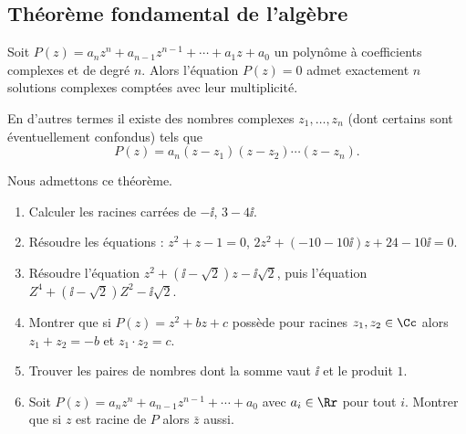 \documentclass[class=report,crop=false]{standalone}
\begin{document}
\subsection{Théorème fondamental de l'algèbre}

\begin{theoreme}
Soit $P (z) = a_n z^n + a_{n - 1} z^{n - 1}
  + \cdots + a_1 z + a_0$ un polyn\^ome \`a coefficients complexes
  et de degré $n$. Alors l'équation $P(z) = 0$ admet exactement $n$
  solutions complexes comptées avec leur multiplicité.

  En d'autres termes il existe des nombres complexes $z_1, \ldots, z_n$ (dont certains sont
  éventuellement confondus) tels que
  \[ P (z) = a_n  \left( z - z_1 \right) \left( z - z_2 \right)
     \cdots \left( z - z_n \right) . \]
\end{theoreme}

Nous admettons ce théorème.



\begin{miniexercices}
\sauteligne
\begin{enumerate}
  \item Calculer les racines carrées de $-\ii$, $3-4\ii$.
  \item Résoudre les équations : $z^2+z-1=0$, $2z^2 + (-10-10\ii)z+24-10\ii = 0$.
  \item Résoudre l'équation $z^2+(\ii-\sqrt 2)z-\ii\sqrt 2$, puis l'équation $Z^4+(\ii-\sqrt 2)Z^2-\ii\sqrt 2$.
  \item Montrer que si $P(z)=z^2+bz+c$ possède pour racines $z_1, z_2 \in \Cc$ alors
$z_1+z_2=-b$ et $z_1 \cdot z_2 = c$.
  \item Trouver les paires de nombres dont la somme vaut $\ii$ et le produit $1$.
  \item Soit $P (z) = a_n z^n + a_{n - 1} z^{n - 1} + \cdots  + a_0$ avec $a_i \in \Rr$ pour tout $i$.
Montrer que si $z$ est racine de $P$ alors $\bar z$ aussi.
\end{enumerate}
\end{miniexercices}


\end{document}
